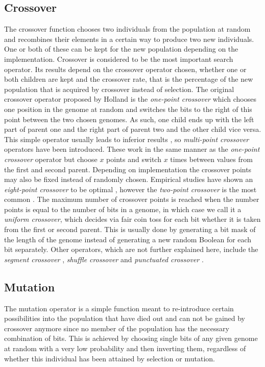 \subsection{Crossover}
\label{sec:crossover}

The crossover function chooses two individuals from the population at random and recombines their elements in a certain way to produce two new individuals. One or both of these can be kept for the new population depending on the implementation. Crossover is considered to be the most important search operator\cite{16}. Its results depend on the crossover operator chosen, whether one or both children are kept and the crossover rate, that is the percentage of the new population that is acquired by crossover instead of selection. The original crossover operator proposed by Holland is the \textit{one-point crossover} which chooses one position in the genome at random and switches the bits to the right of this point between the two chosen genomes. As such, one child ends up with the left part of parent one and the right part of parent two and the other child vice versa. This simple operator usually leads to inferior results \cite{18,19,20}, so \textit{multi-point crossover} operators have been introduced. These work in the same manner as the \textit{one-point crossover} operator but choose $x$ points and switch $x$ times between values from the first and second parent. Depending on implementation the crossover points may also be fixed instead of randomly chosen. Empirical studies have shown an \textit{eight-point crossover} to be optimal \cite{21,22,19}, however the \textit{two-point crossover} is the most common \cite{19}. The maximum number of crossover points is reached when the number points is equal to the number of bits in a genome, in which case we call it a \textit{uniform crossover}, which decides via fair coin toss for each bit whether it is taken from the first or second parent. This is usually done by generating a bit mask of the length of the genome instead of generating a new random Boolean for each bit separately. Other operators, which are not further explained here, include the \textit{segment crossover} \cite{19}, \textit{shuffle crossover} \cite{19} and \textit{punctuated crossover} \cite{23}.

\subsection{Mutation}
\label{sec:mutation}

The mutation operator is a simple function meant to re-introduce certain possibilities into the population that have died out and can not be gained by crossover anymore since no member of the population has the necessary combination of bits. This is achieved by choosing single bits of any given genome at random with a very low probability and then inverting them, regardless of whether this individual has been attained by selection or mutation.
 
